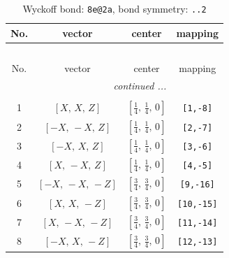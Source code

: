 \documentclass[fleqn,8pt]{jsarticle}
\begin{document}
\begin{longtable}{cccc}
\caption{Wyckoff bond: {\tt 8e@2a}, bond symmetry: {\tt ..2}}
 \\
 \hline \hline
No. & vector & center & mapping \\ \hline \endfirsthead

\multicolumn{3}{l}{\tablename\ \thetable{}} \\
 \hline \hline
No. & vector & center & mapping \\ \hline \endhead

 \hline \hline
\multicolumn{3}{r}{\footnotesize\it continued ...} \\ \endfoot

 \hline \hline
\multicolumn{3}{r}{} \\ \endlastfoot

1 & $\left[ X,\, X,\, Z \right]$ & $\left[ \frac{1}{4},\, \frac{1}{4},\, 0 \right]$ & {\tt [1,-8]} \\ \hline
2 & $\left[ - X,\, - X,\, Z \right]$ & $\left[ \frac{1}{4},\, \frac{1}{4},\, 0 \right]$ & {\tt [2,-7]} \\ \hline
3 & $\left[ - X,\, X,\, Z \right]$ & $\left[ \frac{1}{4},\, \frac{1}{4},\, 0 \right]$ & {\tt [3,-6]} \\ \hline
4 & $\left[ X,\, - X,\, Z \right]$ & $\left[ \frac{1}{4},\, \frac{1}{4},\, 0 \right]$ & {\tt [4,-5]} \\ \hline
5 & $\left[ - X,\, - X,\, - Z \right]$ & $\left[ \frac{3}{4},\, \frac{3}{4},\, 0 \right]$ & {\tt [9,-16]} \\ \hline
6 & $\left[ X,\, X,\, - Z \right]$ & $\left[ \frac{3}{4},\, \frac{3}{4},\, 0 \right]$ & {\tt [10,-15]} \\ \hline
7 & $\left[ X,\, - X,\, - Z \right]$ & $\left[ \frac{3}{4},\, \frac{3}{4},\, 0 \right]$ & {\tt [11,-14]} \\ \hline
8 & $\left[ - X,\, X,\, - Z \right]$ & $\left[ \frac{3}{4},\, \frac{3}{4},\, 0 \right]$ & {\tt [12,-13]} \\
\end{longtable}
\renewcommand{\arraystretch}{1.2}
\end{document}
